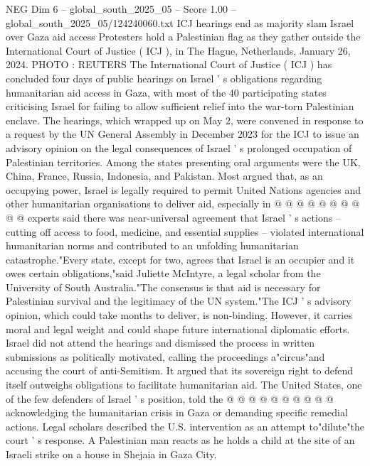 \begin{textsample}{NEG Dim 6 – global\_south\_2025\_05 – Score 1.00 – global\_south\_2025\_05/124240060.txt}  \label{ex:f6_neg_391}
ICJ hearings end as majority slam Israel over Gaza aid access Protesters hold a Palestinian flag as they gather outside the International Court of Justice ( ICJ ), in The Hague, Netherlands, January 26, 2024.
PHOTO : REUTERS The International Court of Justice ( ICJ ) has concluded four days of public hearings on Israel ' s obligations regarding humanitarian aid access in Gaza, with most of the 40 participating states criticising Israel for failing to allow sufficient relief into the war-torn Palestinian enclave.
The hearings, which wrapped up on May 2, were convened in response to a request by the UN General Assembly in December 2023 for the ICJ to issue an advisory opinion on the legal consequences of Israel ' s prolonged occupation of Palestinian territories.
Among the states presenting oral arguments were the UK, China, France, Russia, Indonesia, and Pakistan.
Most argued that, as an occupying power, Israel is legally required to permit United Nations agencies and other humanitarian organisations to deliver aid, especially in @ @ @ @ @ @ @ @ @ @ experts said there was near-universal agreement that Israel ' s actions -- cutting off access to food, medicine, and essential supplies -- violated international humanitarian norms and contributed to an unfolding humanitarian catastrophe."Every state, except for two, agrees that Israel is an occupier and it owes certain obligations,"said Juliette McIntyre, a legal scholar from the University of South Australia."The consensus is that aid is necessary for Palestinian survival and the legitimacy of the UN system."The ICJ ' s advisory opinion, which could take months to deliver, is non-binding.
However, it carries moral and legal weight and could shape future international diplomatic efforts.
Israel did not attend the hearings and dismissed the process in written submissions as politically motivated, calling the proceedings a"circus"and accusing the court of anti-Semitism.
It argued that its sovereign right to defend itself outweighs obligations to facilitate humanitarian aid.
The United States, one of the few defenders of Israel ' s position, told the @ @ @ @ @ @ @ @ @ @ acknowledging the humanitarian crisis in Gaza or demanding specific remedial actions.
Legal scholars described the U.S. intervention as an attempt to"dilute"the court ' s response.
A Palestinian man reacts as he holds a child at the site of an Israeli strike on a house in Shejaia in Gaza City.

\end{textsample}
